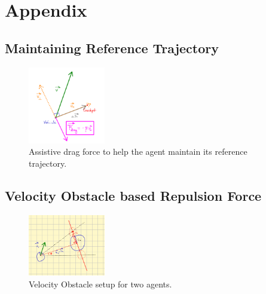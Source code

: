 \documentclass[a4paper,12pt]{article}
\begin{document}






\printbibliography

\newpage

\appendix
\section{Appendix}

\subsection{Maintaining Reference Trajectory}

\begin{figure}[!htbp]
  \centering
  \includegraphics[width=0.3\textwidth]{./figures/intelli_drag.png}
  \caption{Assistive drag force to help the agent maintain its reference trajectory.}
  \label{fig:drag_force}
\end{figure}

\subsection{Velocity Obstacle based Repulsion Force}

\begin{figure}[!hptb]
  \centering
  \includegraphics[width=0.3\textwidth]{./figures/VO_repulsion_setup.png}
  \caption{Velocity Obstacle setup for two agents.}
  \label{fig:velocity_obstacle_setup}
\end{figure}
\end{document}
